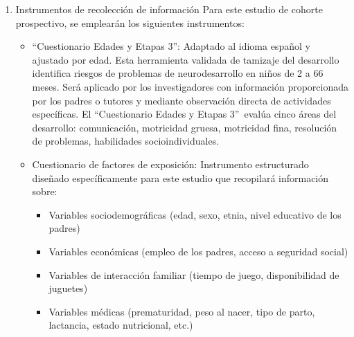 \documentclass[11pt,letterpaper]{report}
\newcommand{\asq}{“Cuestionario Edades y Etapas 3”}
\begin{document}
\begin{enumerate}
\begin{enumerate}
	\end{enumerate}
	\item Instrumentos de recolección de información
	Para este estudio de cohorte prospectivo, se emplearán los siguientes
	instrumentos:
		\begin{itemize}
		\item \asq: Adaptado al idioma español y ajustado por edad. Esta
		herramienta validada de tamizaje del desarrollo identifica riesgos de
		problemas de neurodesarrollo en niños de 2 a 66 meses. Será aplicado
		por los investigadores con información proporcionada por los padres o
		tutores y mediante observación directa de actividades específicas.
		El \asq\ evalúa cinco áreas del desarrollo: comunicación, motricidad
		gruesa, motricidad fina, resolución de problemas, habilidades
		socioindividuales.

		\item Cuestionario de factores de exposición: Instrumento estructurado
		diseñado específicamente para este estudio que recopilará información
		sobre:
				\begin{itemize}
					\item Variables sociodemográficas (edad, sexo, etnia, nivel
					educativo de los padres)
					\item Variables económicas (empleo de los padres, acceso a
					seguridad social)
					\item Variables de interacción familiar (tiempo de juego,
					disponibilidad de juguetes)
					\item Variables médicas (prematuridad, peso al nacer, tipo
					de parto, lactancia, estado nutricional, etc.)
				\end{itemize}
		\end{itemize}
\end{enumerate}
\end{document}
